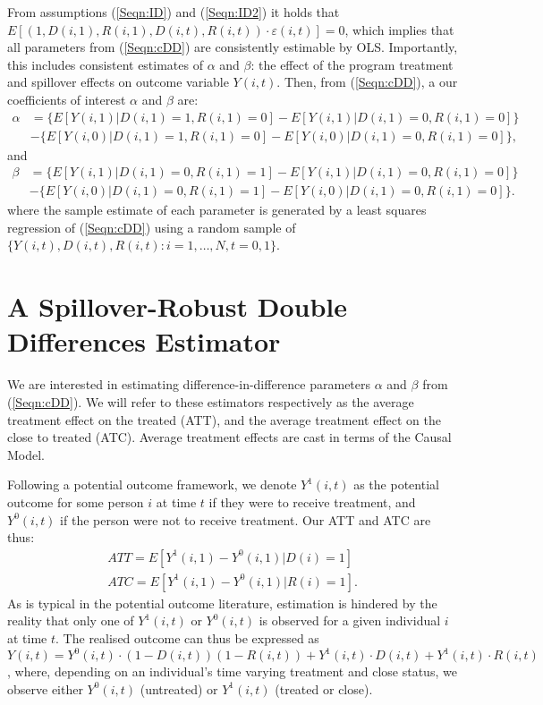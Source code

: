 \documentclass{article}
\begin{document}
\begin{spacing}{1.1}
From assumptions (\ref{Seqn:ID}) and (\ref{Seqn:ID2}) it holds that $E[(1,D(i,1),R(i,1),
D(i,t),R(i,t))\cdot\varepsilon(i,t)]=0$, which implies that all parameters from
(\ref{Seqn:cDD}) are consistently estimable by OLS.  Importantly, this includes
consistent estimates of $\alpha$ and $\beta$: the effect of the program treatment 
and spillover effects on outcome variable $Y(i,t)$.  Then, from (\ref{Seqn:cDD}),
a our coefficients of interest $\alpha$ and $\beta$ are:
\begin{equation}
\label{Seqn:DDa}
\begin{split}
\alpha&=\{E[Y(i,1)|D(i,1)=1,R(i,1)=0]-E[Y(i,1)|D(i,1)=0,R(i,1)=0]\} \\
      &-\{E[Y(i,0)|D(i,1)=1,R(i,1)=0]-E[Y(i,0)|D(i,1)=0,R(i,1)=0]\}, 
\end{split}
\end{equation}
and 
\begin{equation}
\label{Seqn:DDb}
\begin{split}
\beta&=\{E[Y(i,1)|D(i,1)=0,R(i,1)=1]-E[Y(i,1)|D(i,1)=0,R(i,1)=0]\} \\
      &-\{E[Y(i,0)|D(i,1)=0,R(i,1)=1]-E[Y(i,0)|D(i,1)=0,R(i,1)=0]\}. 
\end{split}
\end{equation}
where the sample estimate of each parameter is generated by a least squares
regression of (\ref{Seqn:cDD}) using a random sample of 
$\{Y(i,t), D(i,t), R(i,t): i=1, \ldots, N, t=0, 1\}$.

\section{A Spillover-Robust Double Differences Estimator}
\label{Sscn:estim}
We are interested in estimating difference-in-difference parameters $\alpha$ and 
$\beta$ from (\ref{Seqn:cDD}).  We will refer to these estimators respectively
as the average treatment effect on the treated (ATT), and the average treatment
effect on the close to treated (ATC).  Average treatment effects are cast in 
terms of the \citet{Rubin1974} Causal Model.

Following a potential outcome framework, we denote $Y^1(i,t)$ as the potential
outcome for some person $i$ at time $t$ if they were to receive treatment, and
$Y^0(i,t)$ if the person were not to receive treatment.  Our ATT and ATC are
thus:
\begin{eqnarray}
\label{Seqn:estim}
ATT=E[Y^1(i,1)-Y^0(i,1)|D(i)=1]\  \\
ATC=E[Y^1(i,1)-Y^0(i,1)|R(i)=1].
\end{eqnarray}
As is typical in the potential outcome literature, estimation is hindered by the
reality that only one of $Y^1(i,t)$ or $Y^0(i,t)$ is observed for a given 
individual $i$ at time $t$.  The realised outcome can thus be expressed as 
$Y(i,t)=Y^0(i,t)\cdot (1-D(i,t))(1-R(i,t))+Y^1(i,t)\cdot D(i,t)+Y^1(i,t)\cdot 
R(i,t)$, where, depending on an individual's time varying treatment and close
status, we observe either $Y^0(i,t)$ (untreated) or $Y^1(i,t)$ (treated or 
close).


\end{spacing}
\end{document}
